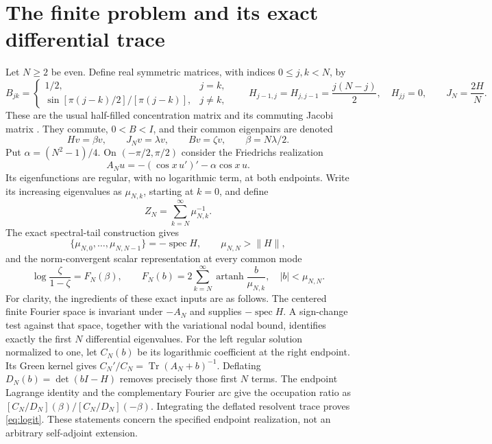 \documentclass[10pt]{article}
\newcommand{\artanh}{\operatorname{artanh}}
\newcommand{\Tr}{\operatorname{Tr}}
\begin{document}
\section{The finite problem and its exact differential trace}
Let $N\ge2$ be even. Define real symmetric matrices, with indices
$0\le j,k<N$, by
\[
B_{jk}=\begin{cases}1/2,&j=k,\\
\sin[\pi(j-k)/2]/[\pi(j-k)],&j\ne k,\end{cases}\qquad
H_{j-1,j}=H_{j,j-1}=\frac{j(N-j)}2,\quad H_{jj}=0,
\qquad J_N=\frac{2H}{N}.
\]
These are the usual half-filled concentration matrix and its commuting
Jacobi matrix \cite{eisler}. They commute, $0<B<I$, and their common
eigenpairs are denoted
\[
Hv=\beta v,\qquad J_Nv=\lambda v,\qquad Bv=\zeta v,
\qquad \beta=N\lambda/2.
\]
Put $\alpha=(N^2-1)/4$. On $(-\pi/2,\pi/2)$ consider the Friedrichs
realization
\[
A_Nu=-(\cos x\,u')'-\alpha\cos x\,u.
\]
Its eigenfunctions are regular, with no logarithmic term, at both
endpoints. Write its increasing eigenvalues as $\mu_{N,k}$, starting
at $k=0$, and define
\begin{equation}
Z_N=\sum_{k=N}^{\infty}\mu_{N,k}^{-1}.
\label{eq:Z}
\end{equation}
The exact spectral-tail construction \cite{tails} gives
\begin{equation}
\{\mu_{N,0},\ldots,\mu_{N,N-1}\}=-\operatorname{spec}H,
\qquad \mu_{N,N}>\|H\|,
\label{eq:finiteblock}
\end{equation}
and the norm-convergent scalar representation at every common mode
\begin{equation}
\log\frac\zeta{1-\zeta}=F_N(\beta),\qquad
F_N(b)=2\sum_{k=N}^{\infty}\artanh\frac b{\mu_{N,k}},
\quad |b|<\mu_{N,N}.
\label{eq:logit}
\end{equation}
For clarity, the ingredients of these exact inputs are as follows.
The centered finite Fourier space is invariant under $-A_N$ and supplies
$-\operatorname{spec}H$. A sign-change test against that space, together
with the variational nodal bound, identifies exactly the first $N$
differential eigenvalues. For the left regular solution normalized to
one, let $C_N(b)$ be its logarithmic coefficient at the right endpoint.
Its Green kernel gives
$C_N'/C_N=\Tr(A_N+b)^{-1}$. Deflating
$D_N(b)=\det(bI-H)$ removes precisely those first $N$ terms.
The endpoint Lagrange identity and the complementary Fourier arc give
the occupation ratio as $[C_N/D_N](\beta)/[C_N/D_N](-\beta)$.
Integrating the deflated resolvent trace proves \eqref{eq:logit}.
These statements concern the specified endpoint realization, not an
arbitrary self-adjoint extension.
\end{document}
